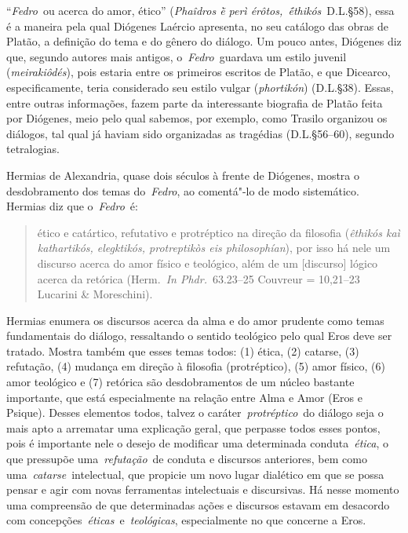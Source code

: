  
 

``\emph{Fedro}~ou acerca do amor, ético'' (\emph{Phaîdros ḕ perì
érôtos,~ḗthikós}~D.L.§58), essa é a maneira pela qual Diógenes Laércio
apresenta, no seu catálogo das obras de Platão, a definição do tema e do
gênero do diálogo. Um pouco antes, Diógenes diz que, segundo autores mais
antigos, o~\emph{Fedro}~guardava um estilo juvenil (\emph{meirakiôdés}),
pois estaria entre os primeiros escritos de Platão, e que Dicearco,
especificamente, teria considerado seu estilo vulgar (\emph{phortikón})
(D.L.§38). Essas, entre outras informações, fazem parte da interessante
biografia de Platão feita por Diógenes, meio pelo qual sabemos, por
exemplo, como Trasilo organizou os diálogos, tal qual já haviam sido
organizadas as tragédias (D.L.§56--60), segundo tetralogias.

Hermias de Alexandria, quase dois séculos à frente de Diógenes, mostra o
desdobramento dos temas do~\emph{Fedro}, ao comentá"-lo de modo
sistemático. Hermias diz que o~\emph{Fedro}~é:

 

\begin{quote}
\redondo{[…]} ético e catártico, refutativo e protréptico na direção da
filosofia (\emph{êthikós kaì kathartikós, elegktikós, protreptikòs eis
philosophían}), por isso há nele um discurso acerca do amor físico e
teológico, além de um [discurso] lógico acerca da retórica
(Herm.~\emph{In Phdr.}~63.23--25 Couvreur = 10,21--23 Lucarini \&
Moreschini).
\end{quote}

 

Hermias enumera os discursos acerca da alma e do amor prudente como
temas fundamentais do diálogo, ressaltando o sentido teológico pelo qual
Eros deve ser tratado. Mostra também que esses temas todos: (1) ética,
(2) catarse, (3) refutação, (4) mudança em direção à filosofia
(protréptico), (5) amor físico, (6) amor teológico e (7) retórica são
desdobramentos de um núcleo bastante importante, que está especialmente
na relação entre Alma e Amor (Eros e Psique). Desses elementos todos,
talvez o caráter~\emph{protréptico}~do diálogo seja o mais apto a
arrematar uma explicação geral, que perpasse todos esses pontos, pois é
importante nele o desejo de modificar uma determinada
conduta~\emph{ética}, o que pressupõe uma~\emph{refutação}~de conduta e
discursos anteriores, bem como uma~\emph{catarse}~intelectual, que
propicie um novo lugar dialético em que se possa pensar e agir com novas
ferramentas intelectuais e discursivas. Há nesse momento uma compreensão
de que determinadas ações e discursos estavam em desacordo com
concepções~\emph{éticas}~e~\emph{teológicas}, especialmente no que
concerne a Eros.


